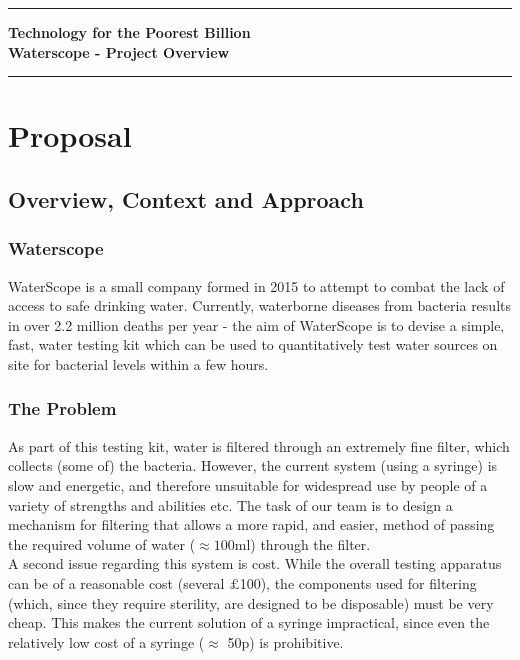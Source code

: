 \documentclass[12pt]{article}
\begin{document}
\noindent

\begin{center}
\rule{15.7cm}{0.5mm}
{\bf Technology for the Poorest Billion}\\
\vspace{0.5cm} {\bf Waterscope - Project Overview}\\
\rule{15.7cm}{0.5mm}
\end{center}

\section{Proposal}
\subsection{Overview, Context and Approach}
\subsubsection{Waterscope}
WaterScope is a small company formed in 2015 to attempt to combat the lack of access to safe drinking water. Currently, waterborne diseases from bacteria results in over 2.2 million deaths per year - the aim of WaterScope is to devise a simple, fast, water testing kit which can be used to quantitatively test water sources on site for bacterial levels within a few hours.
\subsubsection{The Problem}
As part of this testing kit, water is filtered through an extremely fine filter, which collects (some of) the bacteria. However, the current system (using a syringe) is slow and energetic, and therefore unsuitable for widespread use by people of a variety of strengths and abilities etc. The task of our team is to design a mechanism for filtering that allows a more rapid, and easier, method of passing the required volume of water ($\approx 100$ml) through the filter.\\
A second issue regarding this system is cost. While the overall testing apparatus can be of a reasonable cost (several $\pounds$100), the components used for filtering (which, since they require sterility, are designed to be disposable) must be very cheap. This makes the current solution of a syringe impractical, since even the relatively low cost of a syringe ($\approx$ 50p) is prohibitive.
\end{document}
